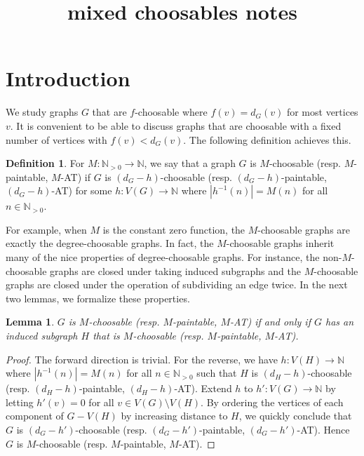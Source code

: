 \documentclass[12pt]{article}
\theoremstyle{plain}
\newtheorem{lem}[thm]{Lemma}
\theoremstyle{definition}
\newtheorem{defn}{Definition}
\theoremstyle{remark}
\newcommand{\IN}{\mathbb{N}}
\newcommand{\card}[1]{\left|#1\right|}
\newcommand{\func}[3]{#1\colon #2 \rightarrow #3}
\begin{document}
\title{mixed choosables notes}
\author{}
\maketitle

\section{Introduction}

We study graphs $G$ that are $f$-choosable where $f(v) = d_G(v)$ for most vertices $v$.  It is convenient to be able to discuss graphs that are choosable with a fixed number of vertices with $f(v) < d_G(v)$.  The following definition achieves this.
\begin{defn}
	For $\func{M}{\IN_{>0}}{\IN}$, we say that a graph $G$ is $M$-choosable (resp. $M$-paintable, $M$-AT) if $G$ is $(d_G - h)$-choosable (resp. $(d_G - h)$-paintable, $(d_G - h)$-AT) for some $\func{h}{V(G)}{\IN}$ where $\card{h^{-1}(n)} = M(n)$ for all $n \in \IN_{>0}$.
\end{defn}

For example, when $M$ is the constant zero function, the $M$-choosable graphs are exactly the degree-choosable graphs.  In fact, the $M$-choosable graphs inherit many of the nice properties of degree-choosable graphs. For instance, the non-$M$-choosable graphs are closed under taking induced subgraphs and the $M$-choosable graphs are closed under the operation of subdividing an edge twice.  In the next two lemmas, we formalize these properties.

\begin{lem}\label{InducedSubgraph}
	$G$ is $M$-choosable (resp. $M$-paintable, $M$-AT) if and only if $G$ has an induced subgraph $H$ that is $M$-choosable (resp. $M$-paintable, $M$-AT).
\end{lem}
\begin{proof}
	The forward direction is trivial.  For the reverse, we have $\func{h}{V(H)}{\IN}$ where $\card{h^{-1}(n)} = M(n)$ for all $n \in \IN_{>0}$ such that $H$ is $(d_H - h)$-choosable (resp. $(d_H - h)$-paintable, $(d_H - h)$-AT).  Extend $h$ to $\func{h'}{V(G)}{\IN}$ by letting $h'(v) = 0$ for all $v \in V(G) \setminus V(H)$.  By ordering the vertices of each component of $G - V(H)$ by increasing distance to $H$, we quickly conclude that $G$ is $(d_G - h')$-choosable (resp. $(d_G - h')$-paintable, $(d_G - h')$-AT).  Hence $G$ is $M$-choosable (resp. $M$-paintable, $M$-AT).
\end{proof}
\end{document}
